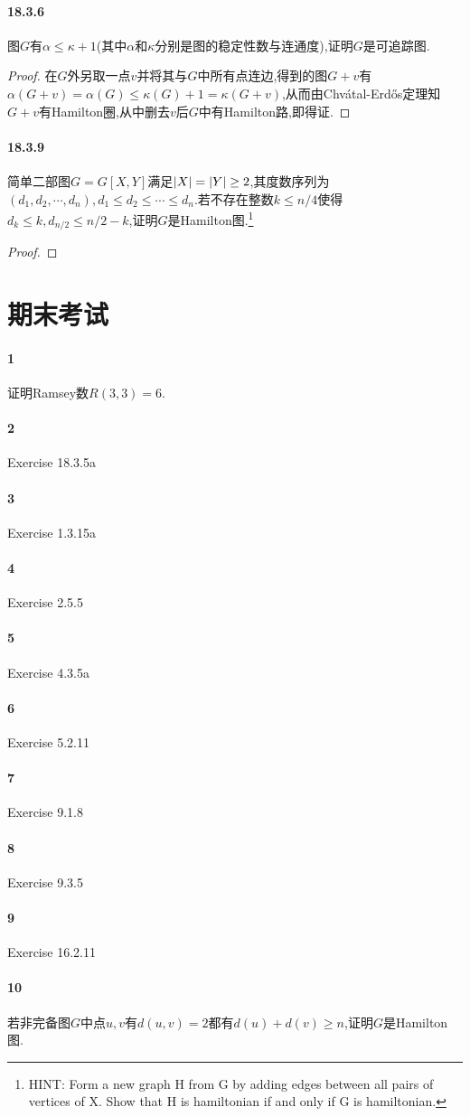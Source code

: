 \documentclass[11pt]{article}
\begin{document}
\paragraph{18.3.6}图$G$有$\alpha\leq\kappa+1$(其中$\alpha$和$\kappa$分别是图的稳定性数与连通度),证明$G$是可追踪图.
\begin{proof}
    在$G$外另取一点$v$并将其与$G$中所有点连边,得到的图$G+v$有$\alpha(G+v)=\alpha(G)\leq \kappa(G)+1=\kappa(G+v)$,从而由Chvátal-Erdős定理知$G+v$有Hamilton圈,从中删去$v$后$G$中有Hamilton路,即得证.
\end{proof}

\paragraph{18.3.9}简单二部图$G=G[X,Y]$满足$\left|X\right|=\left|Y\right|\geq 2$,其度数序列为$(d_1,d_2,\cdots,d_n), d_1\leq d_2\leq\cdots\leq d_n$.若不存在整数$k\leq n/4$使得$d_k\leq k, d_{n/2}\leq n/2-k$,证明$G$是Hamilton图.\footnote{HINT: Form a new graph H from G by adding edges between all pairs of vertices of X. Show that H is hamiltonian if and only if G is hamiltonian.}
\begin{proof}
    
\end{proof}

\newpage
\section{期末考试}
\paragraph{1} 证明Ramsey数$R(3,3)=6$.
\paragraph{2} Exercise 18.3.5a
\paragraph{3} Exercise 1.3.15a
\paragraph{4} Exercise 2.5.5
\paragraph{5} Exercise 4.3.5a
\paragraph{6} Exercise 5.2.11
\paragraph{7} Exercise 9.1.8
\paragraph{8} Exercise 9.3.5
\paragraph{9} Exercise 16.2.11
\paragraph{10} 若非完备图$G$中点$u,v$有$d(u,v)=2$都有$d(u)+d(v)\geq n$,证明$G$是Hamilton图.
\end{document}
